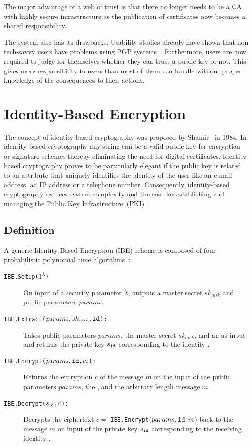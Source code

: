 The major advantage of a web of trust is that there no longer needs to be a CA with highly secure infrastructure as the publication of certificates now becomes a shared responsibility.

The system also has its drawbacks. Usability studies already have shown that non tech-savvy users have problems using PGP systems~\cite{art:WhittenT99}. Furthermore, users are now required to judge for themselves whether they can trust a public key or not. This gives more responsibility to users than most of them can handle without proper knowledge of the consequences to their actions.

\section{Identity-Based Encryption}
The concept of identity-based cryptography was proposed by Shamir~\cite{art:Shamir84} in 1984. In identity-based cryptography any string can be a valid public key for encryption or signature schemes thereby eliminating the need for digital certificates. Identity-based cryptography proves to be particularly elegant if the public key is related to an attribute that uniquely identifies the identity of the user like an e-mail address, an IP address or a telephone number. Consequently, identity-based cryptography reduces system complexity and the cost for establishing and managing the Public Key Infrastructure~(PKI)~\cite{art:BaekNSS04}. 


\subsection{Definition}
A generic Identity-Based Encryption (IBE) scheme is composed of four probabilistic polynomial time algorithms~\cite{art:BonehF01}:
\begin{description}
    \item[\texttt{IBE.Setup($1^{\lambda}$)}] On input of a security parameter $\lambda$, outputs a master secret $sk_{msk}$ and public parameters $params$.
    \item[\texttt{IBE.Extract($params, sk_{msk}, \mathtt{id}_{}$):}] Takes public parameters $params$, the master secret $sk_{msk}$, and an \id{} as input and returns the private key $s_{\mathtt{id}_{}}$ corresponding to the identity \id{}.
    \item[\texttt{IBE.Encrypt($params, \mathtt{id}_{}, m$):}] Returns the encryption $c$ of the message $m$ on the input of the public parameters $params$, the \id{}, and the arbitrary length message $m$.
    \item[\texttt{IBE.Decrypt($s_{\mathtt{id}_{}}, c$):}] Decrypts the ciphertext $c =$ \texttt{IBE.Encrypt}($params, \mathtt{id}_{}, m$) back to the message $m$ on input of the private key $s_{\mathtt{id}_{}}$ corresponding to the receiving identity \id{}.
\end{description}

